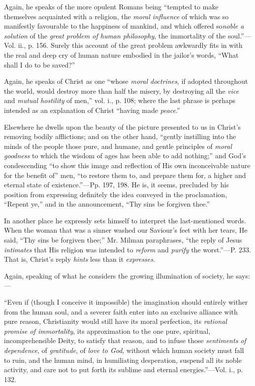 Again, he speaks of the more opulent Romans being
``tempted to make themselves acquainted with a religion, the \emph{moral
influence} of which was so manifestly favourable to the happiness
of mankind, and which offered so\emph{noble a solution} of the \emph{great
problem of human philosophy}, the immortality of the soul.''—Vol.
ii., p. 156. Surely this account of the great problem awkwardly fits
in with the real and deep cry of human nature embodied in the jailor's
words, ``What shall I do to be saved?''

Again, he speaks of Christ as one ``whose \emph{moral
doctrines}, if adopted throughout the world, would destroy more
than half the misery, by destroying all the \emph{vice} and \emph{mutual
hostility} of men,'' vol. i., p. 108; where the last phrase is
perhaps intended as an explanation of Christ ``having made \emph{peace}.''

Elsewhere he dwells upon the beauty of the
picture presented to us in Christ's removing bodily afflictions; and
on the other hand, ``gently instilling into the minds of the people
those pure, and humane, and gentle principles of \emph{moral goodness}
to which the wisdom of ages has been able to add nothing;'' and God's
condescending ``to show this image and reflection of His own
inconceivable nature for the benefit of'' men, ``to restore them to, and
prepare them for, a higher and eternal state of existence.''—Pp. 197,
198. He is, it seems, precluded by his position from expressing
definitely the idea conveyed in the proclamation, ``Repent ye,'' and in
the announcement, ``Thy sins be forgiven thee.''

In another place he expressly sets himself to
interpret the last-mentioned words. When the woman that was a
sinner washed our Saviour's feet with her tears, He said, ``Thy sins be
forgiven thee;'' Mr. Milman paraphrases, ``the reply of Jesus \emph{intimates}
that His religion was intended to \emph{reform} and \emph{purify} the
worst.''—P. 233. That is, Christ's reply \emph{hints} less than it \emph{expresses}.

Again, speaking of what he considers the growing
illumination of society, he says:—

``Even
if (though I conceive it impossible) the imagination should entirely
wither from the human soul, and a severer faith enter into an
exclusive alliance with pure reason, Christianity would still have its
moral perfection, its \emph{rational promise of immortality}, its
approximation to the one pure, spiritual, incomprehensible Deity, to
satisfy that reason, and to infuse those \emph{sentiments of dependence},
of \emph{gratitude}, of \emph{love to God}, without which human
society must fall to ruin, and the human mind, in humiliating
desperation, suspend all its noble activity, and care not to put forth
its sublime and eternal energies.''—Vol.
i., p. 132.

